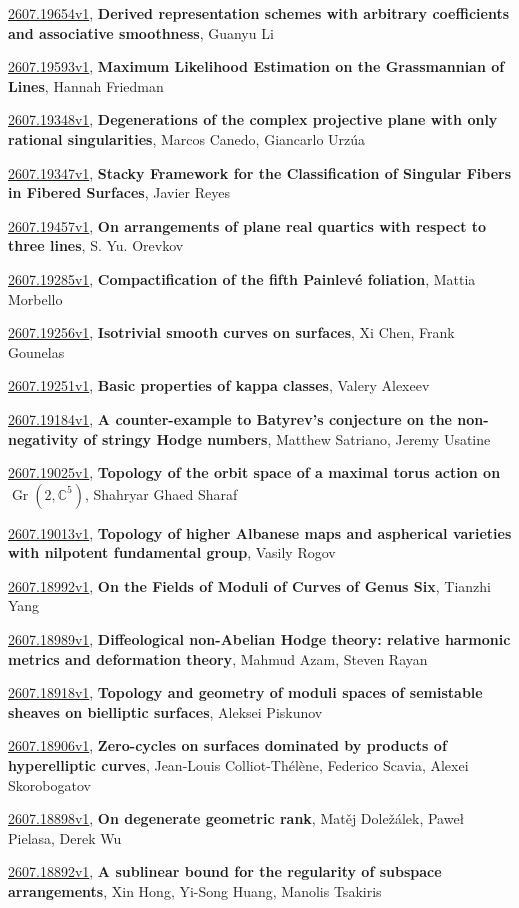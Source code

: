 \documentclass[9pt, a4paper]{article}
\theoremstyle{plain}
\theoremstyle{definition}
\theoremstyle{remark}
\newcommand{\arxiv}[3]{\href{https://arxiv.org/abs/#1}{#1}, \textbf{\textcolor{arxivblue}{#2}}, #3}
\begin{document}
\arxiv{2607.19654v1}{Derived representation schemes with arbitrary coefficients and associative smoothness}{Guanyu Li}

\arxiv{2607.19593v1}{Maximum Likelihood Estimation on the Grassmannian of Lines}{Hannah Friedman}

\arxiv{2607.19348v1}{Degenerations of the complex projective plane with only rational singularities}{Marcos Canedo, Giancarlo Urzúa}

\arxiv{2607.19347v1}{Stacky Framework for the Classification of Singular Fibers in Fibered Surfaces}{Javier Reyes}

\arxiv{2607.19457v1}{On arrangements of plane real quartics with respect to three lines}{S. Yu. Orevkov}

\arxiv{2607.19285v1}{Compactification of the fifth Painlevé foliation}{Mattia Morbello}

\arxiv{2607.19256v1}{Isotrivial smooth curves on surfaces}{Xi Chen, Frank Gounelas}

\arxiv{2607.19251v1}{Basic properties of kappa classes}{Valery Alexeev}

\arxiv{2607.19184v1}{A counter-example to Batyrev's conjecture on the non-negativity of stringy Hodge numbers}{Matthew Satriano, Jeremy Usatine}

\arxiv{2607.19025v1}{Topology of the orbit space of a maximal torus action on $\operatorname{Gr}(2,\mathbb{C}^{5})$}{Shahryar Ghaed Sharaf}

\arxiv{2607.19013v1}{Topology of higher Albanese maps and aspherical varieties with nilpotent fundamental group}{Vasily Rogov}

\arxiv{2607.18992v1}{On the Fields of Moduli of Curves of Genus Six}{Tianzhi Yang}

\arxiv{2607.18989v1}{Diffeological non-Abelian Hodge theory: relative harmonic metrics and deformation theory}{Mahmud Azam, Steven Rayan}

\arxiv{2607.18918v1}{Topology and geometry of moduli spaces of semistable sheaves on bielliptic surfaces}{Aleksei Piskunov}

\arxiv{2607.18906v1}{Zero-cycles on surfaces dominated by products of hyperelliptic curves}{Jean-Louis Colliot-Thélène, Federico Scavia, Alexei Skorobogatov}

\arxiv{2607.18898v1}{On degenerate geometric rank}{Matěj Doležálek, Paweł Pielasa, Derek Wu}

\arxiv{2607.18892v1}{A sublinear bound for the regularity of subspace arrangements}{Xin Hong, Yi-Song Huang, Manolis Tsakiris}
\end{document}
